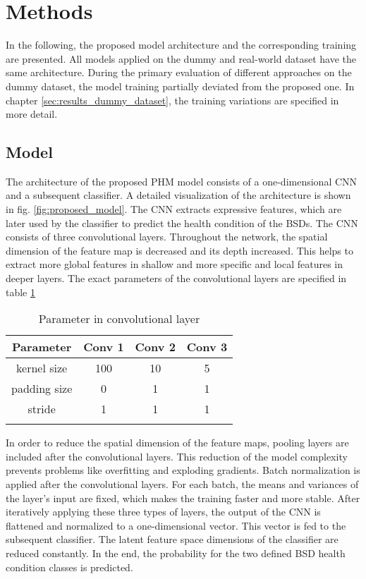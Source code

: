 \section{Methods}\label{chapter:introduction}
In the following, the proposed model architecture and the corresponding training are presented. All models applied on the dummy and real-world dataset have the same architecture. During the primary evaluation of different approaches on the dummy dataset, the model training partially deviated from the proposed one. In chapter \ref{sec:results_dummy_dataset}, the training variations are specified in more detail. 

\subsection{Model}
\label{sec:model}
The architecture of the proposed PHM model consists of a one-dimensional CNN and a subsequent classifier. A detailed visualization of the architecture is shown in fig. \ref{fig:proposed_model}. The CNN extracts expressive features, which are later used by the classifier to predict the health condition of the BSDs. The CNN consists of three convolutional layers. Throughout the network, the spatial dimension of the feature map is decreased and its depth increased. This helps to extract more global features in shallow and more specific and local features in deeper layers. The exact parameters of the convolutional layers are specified in table \ref{tab:parameter_conv} 
\begin{longtable}{c c c c} 
\toprule
Parameter & Conv 1 & Conv 2 & Conv 3 \\
\midrule
kernel size & 100 & 10 & 5 \\

padding size & 0 & 1 & 1 \\

stride & 1 & 1 & 1 \\
\bottomrule
\caption {Parameter in convolutional layer}
\label {tab:parameter_conv}
\end{longtable}

In order to reduce the spatial dimension of the feature maps, pooling layers are included after the convolutional layers. This reduction of the model complexity prevents problems like overfitting and exploding gradients. Batch normalization is applied after the convolutional layers. For each batch, the means and variances of the layer's input are fixed, which makes the training faster and more stable. After iteratively applying these three types of layers, the output of the CNN is flattened and normalized to a one-dimensional vector. This vector is fed to the subsequent classifier. The latent feature space dimensions of the classifier are reduced constantly. In the end, the probability for the two defined BSD health condition classes is predicted.


